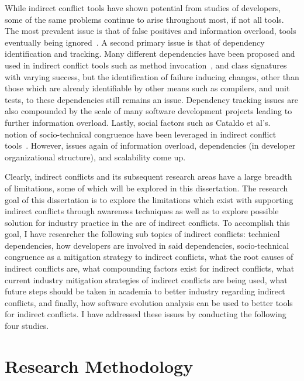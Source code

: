 While indirect conflict tools have shown potential from studies of developers, some of the same problems continue
to arise throughout most, if not all tools. The most prevalent issue is that of false positives and information
overload, tools eventually being
ignored~\cite{Sarma:2007:TSA, Servant:2010:CPI}. A second primary issue is that of dependency identification and
tracking. Many different dependencies have been proposed and used in indirect conflict tools such as method 
invocation~\cite{Trainer:2005:BGT}, and class signatures~\cite{Sarma:2007:TSA} with varying success, but the 
identification of failure inducing changes, other than those which are already identifiable by other means such
as compilers, and unit tests, to these dependencies still remains an issue. Dependency tracking issues are
also compounded by the scale of many software development projects leading to further information overload.
Lastly, social factors such as Cataldo et al's.~\cite{Cataldo:2006:ICR} notion of socio-technical
congruence have been leveraged in indirect conflict tools~\cite{Kwan:2011:ESC, Begel:2010:CDE, Borici:2012:CHA}.
However, issues again of information overload, dependencies (in developer organizational structure), and scalability 
come up.

Clearly, indirect conflicts and its subsequent research areas have a large breadth of limitations, some of which
will be explored in this dissertation. The research goal of this dissertation is to explore the limitations which exist
with supporting indirect conflicts through awareness techniques as well as to explore possible solution for industry practice 
in the are of indirect conflicts. To accomplish this goal, I have researcher the following sub topics of indirect
conflicts: technical dependencies, how developers are involved in said dependencies,
socio-technical congruence as a mitigation strategy to indirect conflicts, what the root causes of indirect conflicts are,
what compounding factors exist for indirect conflicts, what current industry mitigation strategies of indirect conflicts
are being used, what future steps should be taken in academia to better industry regarding indirect conflicts, and finally,
how software evolution analysis can be used to better tools for indirect conflicts. I have addressed these issues by
conducting the following four studies.

\section{Research Methodology}

